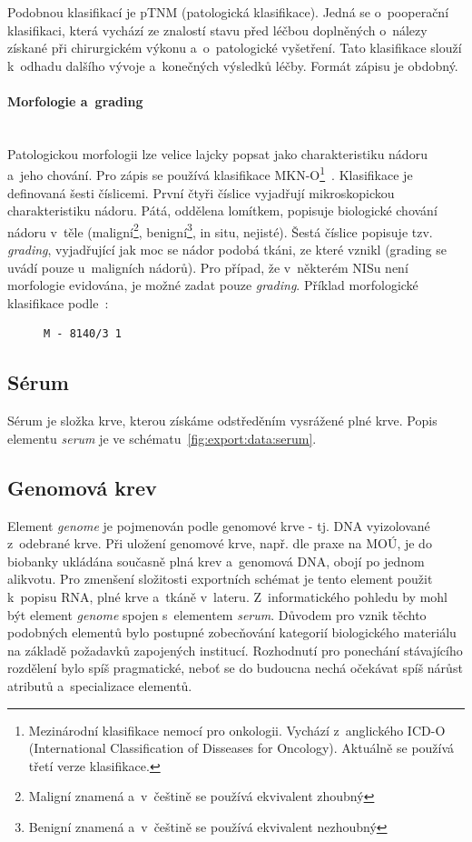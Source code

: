 \documentclass[11pt, draft, oneside]{fithesis2}
\newcommand{\paragraphNewLine}[1]{\paragraph*{#1}\mbox{}\\}
\begin{document}
Podobnou klasifikací je pTNM (patologická klasifikace). Jedná se o~pooperační klasifikaci, která vychází ze znalostí stavu před léčbou doplněných o~nálezy získané při chirurgickém výkonu a~o~patologické vyšetření. Tato klasifikace slouží k~odhadu dalšího vývoje a~konečných výsledků léčby. Formát zápisu je obdobný.

\paragraphNewLine{Morfologie a~grading}
Patologickou morfologii lze velice lajcky popsat jako charakteristiku nádoru a~jeho chování. Pro zápis se používá klasifikace MKN-O\footnote{Mezinárodní klasifikace nemocí pro onkologii. Vychází z~anglického ICD-O (International Classification of Disseases for Oncology). Aktuálně se používá třetí verze klasifikace.}~\cite{MKN-O}. Klasifikace je definovaná šesti číslicemi. První čtyři číslice vyjadřují mikroskopickou charakteristiku nádoru. Pátá, oddělena lomítkem, popisuje biologické chování nádoru v~těle (maligní\footnote{Maligní znamená  a~v~češtině se používá ekvivalent zhoubný}, benigní\footnote{Benigní znamená  a~v~češtině se používá ekvivalent nezhoubný}, in situ, nejisté). Šestá číslice popisuje tzv. \textit{grading}, vyjadřující jak moc se nádor podobá tkáni, ze které vznikl (grading se uvádí pouze u~maligních nádorů). Pro případ, že v~některém NISu není morfologie evidována, je možné zadat pouze \textit{grading}.
Příklad morfologické klasifikace podle~\cite{MKN-O}:

\begin{figure}[h!] %
\centering
\begin{BVerbatim}
M - 8140/3 1
\end{BVerbatim}
\end{figure}

\subsection{Sérum}
Sérum je složka krve, kterou získáme odstředěním vysrážené plné krve. Popis elementu \textit{serum} je ve schématu~\ref{fig:export:data:serum}.

\subsection{Genomová krev}
Element \textit{genome} je pojmenován podle genomové krve - tj. DNA vyizolované z~odebrané krve. Při uložení genomové krve, např. dle praxe na MOÚ, je do biobanky ukládána současně plná krev a~genomová DNA, obojí po jednom alikvotu.
Pro zmenšení složitosti exportních schémat je tento element použit k~popisu RNA, plné krve a~tkáně v~lateru.
Z~informatického pohledu by mohl být element \textit{genome} spojen s~elementem \textit{serum}. Důvodem pro vznik těchto podobných elementů bylo postupné zobecňování kategorií biologického materiálu na základě požadavků zapojených institucí. Rozhodnutí pro ponechání stávajícího rozdělení bylo spíš pragmatické, neboť se do budoucna nechá očekávat spíš nárůst atributů a~specializace elementů. 
\end{document}
